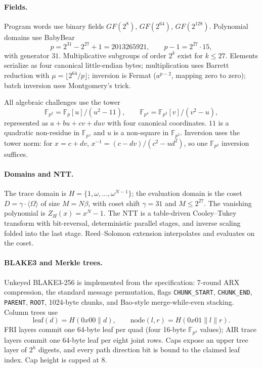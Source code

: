 \documentclass[11pt,a4paper]{article}
\newcommand{\wFp}{\mathbb{F}_p}
\newcommand{\wFpTwo}{\mathbb{F}_{p^2}}
\newcommand{\wFpFour}{\mathbb{F}_{p^4}}
\begin{document}
\paragraph{Fields.} Program words use binary fields $GF(2^8)$,
$GF(2^{64})$, $GF(2^{128})$. Polynomial domains use BabyBear
\[
p=2^{31}-2^{27}+1=2013265921,\qquad p-1=2^{27}\cdot15,
\]
with generator $31$. Multiplicative subgroups of order $2^k$ exist for
$k\le27$. Elements serialize as four canonical little-endian bytes;
multiplication uses Barrett reduction with
$\mu=\lfloor2^{64}/p\rfloor$; inversion is Fermat
($a^{p-2}$, mapping zero to zero); batch inversion uses Montgomery's trick.

All algebraic challenges use the tower
\[
\wFpTwo=\wFp[u]/(u^2-11),\qquad
\wFpFour=\wFpTwo[v]/(v^2-u),
\]
represented as $a+bu+cv+duv$ with four canonical coordinates. $11$ is a
quadratic non-residue in $\wFp$, and $u$ is a non-square in $\wFpTwo$.
Inversion uses the tower norm: for $x=c+dv$,
$x^{-1}=(c-dv)/(c^2-ud^2)$, so one $\wFpTwo$ inversion suffices.

\paragraph{Domains and NTT.} The trace domain is
$H=\{1,\omega,\dots,\omega^{N-1}\}$; the evaluation domain is the coset
$D=\gamma\cdot\langle\Omega\rangle$ of size $M=N\beta$, with coset shift
$\gamma=31$ and $M\le2^{27}$. The vanishing polynomial is
$Z_H(x)=x^N-1$. The NTT is a table-driven Cooley--Tukey transform with
bit-reversal, deterministic parallel stages, and inverse scaling folded into
the last stage. Reed--Solomon extension interpolates and evaluates on the
coset.

\paragraph{BLAKE3 and Merkle trees.} Unkeyed BLAKE3-256 is implemented from
the specification: 7-round ARX compression, the standard message permutation,
flags \texttt{CHUNK\_START}, \texttt{CHUNK\_END}, \texttt{PARENT},
\texttt{ROOT}, 1024-byte chunks, and Bao-style merge-while-even stacking.
Column trees use
\[
\mathrm{leaf}(d)=H(0x00\|d),\qquad
\mathrm{node}(l,r)=H(0x01\|l\|r).
\]
FRI layers commit one 64-byte leaf per quad (four 16-byte $\wFpFour$ values);
AIR trace layers commit one 64-byte leaf per eight joint rows. Caps expose an
upper tree layer of $2^h$ digests, and every path direction bit is bound to
the claimed leaf index. Cap height is capped at 8.
\end{document}
